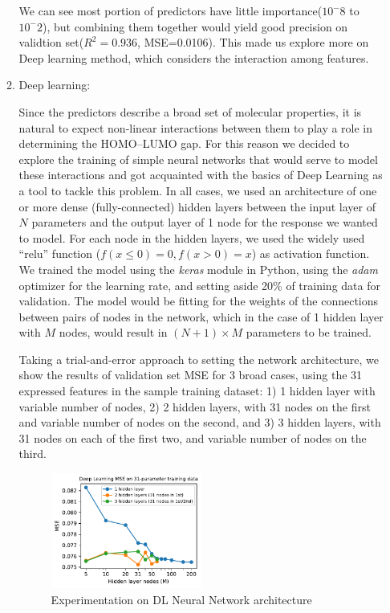 \documentclass[11pt]{article}
\begin{document}
\begin{enumerate}
\begin{enumerate}
We can see most portion of predictors have little importance($10^-8$ to $10^-2$), but combining them together would yield good precision on validtion set($R^2 = 0.936$, MSE=0.0106). This made us explore more on Deep learning method, which considers the interaction among features.

\item Deep learning: 

Since the predictors describe a broad set of molecular properties, it is natural to expect non-linear interactions between them to play a role in determining the HOMO--LUMO gap. For this reason we decided to explore the training of simple neural networks that would serve to model these interactions and got acquainted with the basics of Deep Learning as a tool to tackle this problem. In all cases, we used an architecture of one or more dense (fully-connected) hidden layers between the input layer of $N$ parameters and the output layer of 1 node for the response we wanted to model. For each node in the hidden layers, we used the widely used ``relu'' function ($f(x \le 0) = 0, f(x > 0) = x$) as activation function. We trained the model using the \emph{keras} module in Python, using the \emph{adam} optimizer for the learning rate, and setting aside 20\% of training data for validation. The model would be fitting for the weights of the connections between pairs of nodes in the network, which in the case of 1 hidden layer with $M$ nodes, would result in $(N + 1) \times M$ parameters to be trained.

Taking a trial-and-error approach to setting the network architecture, we show the results of validation set MSE for 3 broad cases, using the 31 expressed features in the sample training dataset: 1) 1 hidden layer with variable number of nodes, 2) 2 hidden layers, with 31 nodes on the first and variable number of nodes on the second, and 3) 3 hidden layers, with 31 nodes on each of the first two, and variable number of nodes on the third.

\begin{figure}[h]
\centering
\includegraphics[width=0.5\textwidth]{Antonio_DL_mse.pdf}
\caption{Experimentation on DL Neural Network architecture}
\label{fig:DL_mse}
\end{figure}


\end{enumerate}
\end{enumerate}
\end{document}

